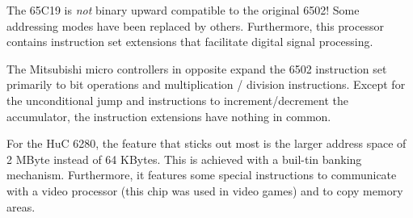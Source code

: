 \documentclass[12pt,twoside]{report}
\begin{document}
The 65C19 is {\em not} binary upward compatible to the original
6502! Some addressing modes have been replaced by others.
Furthermore, this processor contains instruction set extensions
that facilitate digital signal processing.

The Mitsubishi micro controllers in opposite expand
the 6502 instruction set primarily to bit operations and multiplication /
division instructions.  Except for the unconditional jump and instructions
to increment/decrement the accumulator, the instruction extensions
have nothing in common.

For the HuC 6280, the feature that sticks out most is the larger
address space of 2 MByte instead of 64 KBytes.  This is achieved
with a buil-tin banking mechanism.  Furthermore, it features some
special instructions to communicate with a video processor (this
chip was used in video games) and to copy memory areas.
\end{document}

